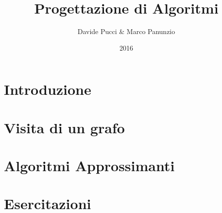 

\title{Progettazione di Algoritmi}
\author{Davide Pucci \& Marco Panunzio}
\date{2016}



\maketitle

\tableofcontents

\chapter{Introduzione}


\chapter{Visita di un grafo}


\chapter{Algoritmi Approssimanti}


\chapter{Esercitazioni}


